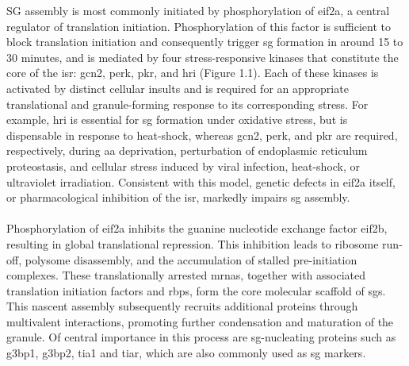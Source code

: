 SG assembly is most commonly initiated by phosphorylation of \gls{eif2a}\cite{anderson_visibly_2002}, a central regulator of translation initiation\cite{anderson_visibly_2002}. Phosphorylation of this factor is sufficient to block translation initiation and consequently trigger \gls{sg} formation\cite{kedersha_rna-binding_1999} in around 15 to 30 minutes\cite{hofmann_translation_2012}, and is mediated by four stress-responsive kinases that constitute the core of the \gls{isr}\cite{donnelly_eif2_2013, aulas_stress-specific_2017, wek_role_2018}: \gls{gcn2}, \gls{perk}, \gls{pkr}, and \gls{hri} (Figure 1.1). Each of these kinases is activated by distinct cellular insults and is required for an appropriate translational and granule-forming response to its corresponding stress\cite{aulas_stress-specific_2017, wek_role_2018}. For example, \gls{hri} is essential for \gls{sg} formation under oxidative stress\cite{mcewen_heme-regulated_2005}, but is dispensable in response to heat-shock\cite{aulas_stress-specific_2017}, whereas \gls{gcn2}, \gls{perk}, and \gls{pkr} are required, respectively, during \gls{aa} deprivation\cite{wek_histidyl-trna_1995}, perturbation of endoplasmic reticulum proteostasis\cite{harding_perk_2000}, and cellular stress\cite{srivastava_phosphorylation_1998} induced by viral infection, heat-shock, or ultraviolet irradiation. Consistent with this model, genetic defects in \gls{eif2a} itself\cite{kedersha_rna-binding_1999}, or pharmacological inhibition of the \gls{isr}\cite{sidrauski_small_2015}, markedly impairs \gls{sg} assembly.
\\
\\
Phosphorylation of \gls{eif2a} inhibits the guanine nucleotide exchange factor \gls{eif2b}, resulting in global translational repression\cite{wek_role_2018}. This inhibition leads to ribosome run-off, polysome disassembly, and the accumulation of stalled pre-initiation complexes\cite{kedersha_dynamic_2000}. These translationally arrested \glspl{mrna}, together with associated translation initiation factors and \glspl{rbp}, form the core molecular scaffold of \glspl{sg}\cite{kedersha_dynamic_2000}. This nascent assembly subsequently recruits additional proteins through multivalent interactions, promoting further condensation and maturation of the granule\cite{kedersha_rna-binding_1999, kedersha_dynamic_2000}. Of central importance in this process are \gls{sg}-nucleating proteins such as \gls{g3bp1}, \gls{g3bp2}, \gls{tia1} and  \gls{tiar}, which are also commonly used as \gls{sg} markers\cite{aulas_stress-specific_2017}.
